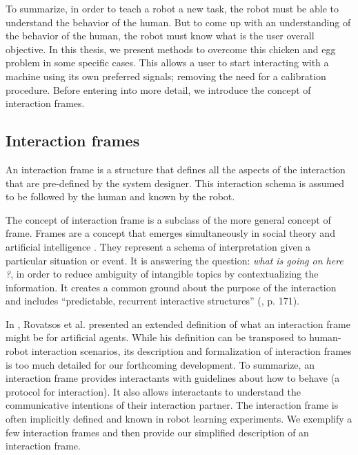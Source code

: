 To summarize, in order to teach a robot a new task, the robot must be able to understand the behavior of the human. But to come up with an understanding of the behavior of the human, the robot must know what is the user overall objective. In this thesis, we present methods to overcome this chicken and egg problem in some specific cases. This allows a user to start interacting with a machine using its own preferred signals; removing the need for a calibration procedure. Before entering into more detail, we introduce the concept of interaction frames.

\subsection{Interaction frames}

An interaction frame \cite{rovatsos2001interaction} is a structure that defines all the aspects of the interaction that are pre-defined by the system designer. This interaction schema is assumed to be followed by the human and known by the robot.

The concept of interaction frame is a subclass of the more general concept of frame. Frames are a concept that emerges simultaneously in social theory \cite{goffman1974frame} and artificial intelligence \cite{minsky1974framework}. They represent a schema of interpretation given a particular situation or event. It is answering the question: \emph{what is going on here ?}, in order to reduce ambiguity of intangible topics by contextualizing the information. It creates a common ground about the purpose of the interaction \cite{tomasello2009cultural,rohlfing2013learning} and includes ``predictable, recurrent interactive structures'' (\cite{ninio1996pragmatic}, p. 171). 

In \cite{rovatsos2001interaction}, Rovatsos et al. presented an extended definition of what an interaction frame might be for artificial agents. While his definition can be transposed to human-robot interaction scenarios, its description and formalization of interaction frames is too much detailed for our forthcoming development. To summarize, an interaction frame provides interactants with guidelines about how to behave (a protocol for interaction). It also allows interactants to understand the communicative intentions of their interaction partner. The interaction frame is often implicitly defined and known in robot learning experiments. We exemplify a few interaction frames and then provide our simplified description of an interaction frame.

